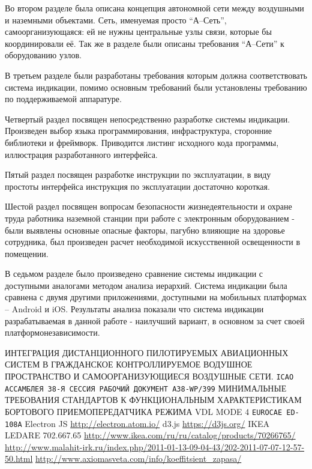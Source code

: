 \documentclass[a4paper,12pt]{report} %
\begin{document}
Во втором разделе была описана концепция автономной сети между воздушными и
наземными объектами. Сеть, именуемая просто ``А--Сеть'', самоорганизующаяся: ей
не нужны центральные узлы связи, которые бы координировали её. Так же в разделе
были описаны требования ``А--Сети'' к оборудованию узлов.

В третьем разделе были разработаны требования которым должна соответствовать
система индикации, помимо основным требований были установлены требованию по
поддерживаемой аппаратуре.

Четвертый раздел посвящен непосредственно разработке системы индикации.
Произведен выбор языка программирования, инфраструктура, сторонние библиотеки и
фреймворк. Приводится листинг исходного кода программы, иллюстрация
разработанного интерфейса.

Пятый раздел посвящен разработке инструкции по эксплуатации, в виду простоты
интерфейса инструкция по эксплуатации достаточно короткая.

Шестой раздел посвящен вопросам безопасности жизнедеятельности и охране труда
работника наземной станции при работе с электронным оборудованием - были
выявлены основные опасные факторы, пагубно влияющие на здоровье сотрудника, был
произведен расчет необходимой искусственной освещенности в помещении.

В седьмом разделе было произведено сравнение системы индикации с доступными
аналогами методом анализа иерархий. Система индикации была сравнена с двумя
другими приложениями, доступными на мобильных платформах -- Android и iOS.
Результаты анализа показали что система индикации разрабатываемая в данной
работе - наилучший вариант, в основном за счет своей платформонезависимости.
\newpage


\begin{thebibliography}{9}
  ИНТЕГРАЦИЯ ДИСТАНЦИОННОГО ПИЛОТИРУЕМЫХ АВИАЦИОННЫХ СИСТЕМ В ГРАЖДАНСКОЕ
  КОНТРОЛЛИРУЕМОЕ ВОДУШНОЕ ПРОСТРАНСТВО И САМООРГАНИЗУЮЩИЕСЯ ВОЗДУШНЫЕ СЕТИ.
  \texttt{ICAO АССАМБЛЕЯ 38-Я СЕССИЯ РАБОЧИЙ ДОКУМЕНТ A38-WP/399}
  МИНИМАЛЬНЫЕ ТРЕБОВАНИЯ СТАНДАРТОВ К ФУНКЦИОНАЛЬНЫМ ХАРАКТЕРИСТИКАМ БОРТОВОГО
  ПРИЕМОПЕРЕДАТЧИКА РЕЖИМА VDL MODE 4 \texttt{EUROCAE ED-108A}
  Electron JS \url{http://electron.atom.io/}
  d3.js \url{https://d3js.org/}
  IKEA LEDARE 702.667.65 \url{http://www.ikea.com/ru/ru/catalog/products/70266765/}
  \url{http://www.malahit-irk.ru/index.php/2011-01-13-09-04-43/202-2011-07-07-12-57-50.html}
  \url{http://www.axiomasveta.com/info/koeffitsient_zapasa/}
\end{thebibliography}
\end{document}

